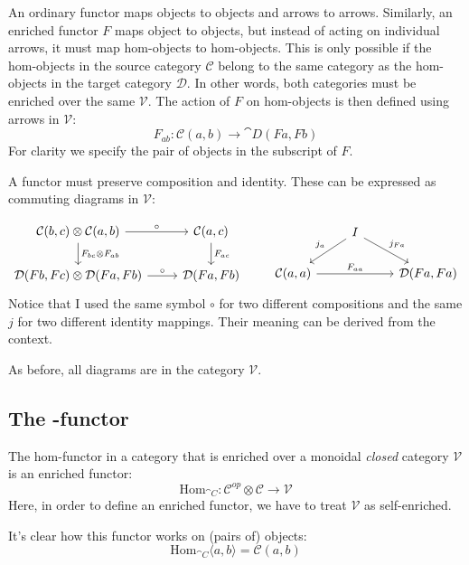 \documentclass[DaoFP]{subfiles}
\begin{document}
An ordinary functor maps objects to objects and arrows to arrows. Similarly, an enriched functor $F$ maps object to objects, but instead of acting on individual arrows, it must map hom-objects to hom-objects. This is only possible if the hom-objects in the source category $\mathcal C$ belong to the same category as the hom-objects in the target category $\mathcal D$. In other words, both categories must be enriched over the same $\mathcal V$. The action of $F$ on hom-objects is then defined using arrows in $\mathcal V$:
\[ F_{a b} \colon \mathcal C (a, b) \to \cat D (F a, F b) \]
For clarity we specify the pair of objects in the subscript of $F$.

A functor must preserve composition and identity. These can be expressed as commuting diagrams in $\mathcal V$:

\[
 \begin{tikzcd}
 \mathcal C(b, c) \otimes \mathcal C(a, b) 
 \arrow[r, "\circ"]
 \arrow[d, "F_{b c} \otimes F_{a b}"]
 & \mathcal C(a, c)
 \arrow[d, "F_{a c}"]
 \\
 \mathcal D(F b, F c) \otimes \mathcal D (F a, F b)
 \arrow[r, "\circ"]
 & \mathcal D(F a, F b)
 \end{tikzcd}
 \qquad
 \begin{tikzcd}
 & I
 \arrow[dl, "j_a"']
 \arrow[dr, "j_{F a}"]
 \\
 \mathcal C(a, a)
 \arrow[rr, "F_{a a}"]
 && \mathcal D( F a, F a)
  \end{tikzcd}
\]
Notice that I used the same symbol $\circ$ for two different compositions and the same $j$ for two different identity mappings. Their meaning can be derived from the context.

As before, all diagrams are in the category $\mathcal V$.

\subsection{The -functor}

The hom-functor in a category that is enriched over a monoidal \emph{closed} category $\mathcal V$ is an enriched functor:
\[ \text{Hom}_{\cat C} \colon \mathcal C^{op} \otimes \mathcal C \to \mathcal V \]
Here, in order to define an enriched functor, we have to treat $\mathcal V$ as self-enriched. 

It's clear how this functor works on (pairs of) objects:
\[ \text{Hom}_{\cat C} \langle a, b \rangle = \mathcal C (a, b) \]
\end{document}
